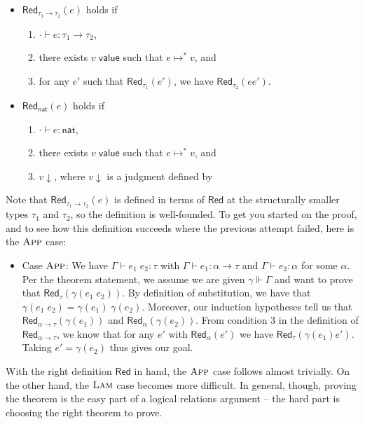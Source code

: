 \documentclass{article}
\newcommand{\m}[1]{\mathsf{#1}}
\newcommand{\eapp}[2]{#1 \; #2}
\newcommand{\step}{\mapsto}
\newcommand{\val}[1]{#1 \; \m{value}}
\newcommand{\G}{\Gamma}
\newcommand{\mstep}{\step^{*}}
\newcommand{\zero}{\m{zero}}
\renewcommand{\succ}[1]{\m{succ}(#1)}
\newcommand{\tnat}{\m{nat}}
\newcommand{\Red}{\m{Red}}
\newcommand{\natred}[1]{#1 \downarrow}
\newcommand{\issubst}{\Vdash}
\begin{document}
\begin{itemize}
  \item $\Red_{\tau_1 \to \tau_2}(e)$ holds if
    \begin{enumerate}
      \item $\cdot \vdash e : \tau_1 \to \tau_2$,
      \item there exists $\val{v}$ such that $e \mstep v$, and
      \item for any $e'$ such that $\Red_{\tau_1}(e')$, we have
        $\Red_{\tau_2}(e e')$.
    \end{enumerate}
  \item $\Red_\tnat(e)$ holds if
    \begin{enumerate}
      \item $\cdot \vdash e : \tnat$,
      \item there exists $\val{v}$ such that $e \mstep v$, and
      \item $\natred{v}$, where $\natred{v}$ is a judgment defined by
    \end{enumerate}
\end{itemize}
Note that $\Red_{\tau_1 \to \tau_2}(e)$ is defined in terms of $\Red$
at the structurally smaller types $\tau_1$ and $\tau_2$, so the
definition is well-founded. To get you started on the proof, and to
see how this definition succeeds where the previous attempt failed,
here is the $\textsc{App}$ case:
\begin{itemize}
  \item Case $\textsc{App}$: We have $\G \vdash \eapp{e_1}{e_2} : \tau$
    with $\G \vdash e_1 : \alpha \to \tau$ and $\G \vdash e_2 :
    \alpha$ for some $\alpha$. Per the theorem statement, we assume we
    are given $\gamma \issubst \G$ and want to prove that
    $\Red_\tau(\gamma(\eapp{e_1}{e_2}))$.  By definition of substitution, we
    have that $\gamma(\eapp{e_1}{e_2}) = \eapp{\gamma(e_1)}{\gamma(e_2)}$. Moreover,
    our induction hypotheses tell us that $\Red_{\alpha \to
      \tau}(\gamma(e_1))$ and $\Red_{\alpha}(\gamma(e_2))$. From
    condition 3 in the definition of $\Red_{\alpha \to \tau}$, we know
    that for any $e'$ with $\Red_{\alpha}(e')$ we have
    $\Red_{\tau}(\gamma(e_1)e')$. Taking $e' = \gamma(e_2)$ thus gives
    our goal.
\end{itemize}
With the right definition $\Red$ in hand, the $\textsc{App}$ case
follows almost trivially. On the other hand, the $\textsc{Lam}$ case
becomes more difficult. In general, though, proving the theorem is the
easy part of a logical relations argument -- the hard part is choosing
the right theorem to prove.
\end{document}

